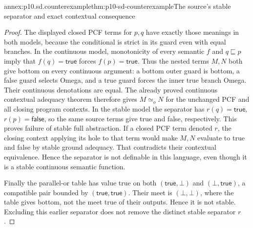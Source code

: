 \begin{annexitem}{annex:p10.sd.counterexample}{thm:p10-sd-counterexample}{The source's stable separator and exact contextual consequence}
\begin{proof}
The displayed closed PCF terms for \(p,q\) have exactly those meanings
in both models, because the conditional is strict in its guard even
with equal branches. In the continuous model, monotonicity of every
semantic \(f\) and \(q\sqsubseteq p\) imply that \(f(q)=\mathsf{true}\)
forces \(f(p)=\mathsf{true}\). Thus the nested terms \(M,N\) both
give bottom on every continuous argument: a bottom outer guard is
bottom, a false guard selects Omega, and a true guard forces the inner
true branch Omega. Their continuous denotations are equal. The already
proved continuous contextual adequacy theorem therefore gives
\(M\simeq_o N\) for the unchanged PCF and all closing program contexts.
In the stable model the separator has \(r(q)=\mathsf{true}\),
\(r(p)=\mathsf{false}\), so the same source terms give true and false,
respectively. This proves failure of stable full abstraction.
If a closed PCF term denoted \(r\), the closing context applying its
hole to that term would make \(M,N\) evaluate to true and false by
stable ground adequacy. That contradicts their contextual equivalence.
Hence the separator is not definable in this language, even though it
is a stable continuous semantic function.

Finally the parallel-or table has value true on both
\((\mathsf{true},\bot)\) and \((\bot,\mathsf{true})\), a compatible
pair bounded by \((\mathsf{true},\mathsf{true})\). Their meet is
\((\bot,\bot)\), where the table gives bottom, not the meet true of
their outputs. Hence it is not stable. Excluding this earlier separator
does not remove the distinct stable separator \(r\).
\end{proof}
\end{annexitem}
